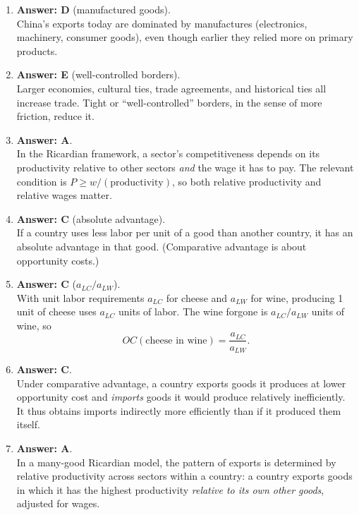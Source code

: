 \documentclass[12pt]{article}
\begin{document}
\begin{enumerate}[label=\textbf{\arabic*.}]
\item \textbf{Answer: D} (manufactured goods).\\
China’s exports today are dominated by manufactures (electronics, machinery, consumer goods), even though earlier they relied more on primary products.

\item \textbf{Answer: E} (well-controlled borders).\\
Larger economies, cultural ties, trade agreements, and historical ties all increase trade. Tight or “well-controlled” borders, in the sense of more friction, reduce it.

\item \textbf{Answer: A}.\\
In the Ricardian framework, a sector’s competitiveness depends on its productivity relative to other sectors \emph{and} the wage it has to pay. The relevant condition is $P \ge w/(\text{productivity})$, so both relative productivity and relative wages matter.

\item \textbf{Answer: C} (absolute advantage).\\
If a country uses less labor per unit of a good than another country, it has an absolute advantage in that good. (Comparative advantage is about opportunity costs.)

\item \textbf{Answer: C} ($a_{LC}/a_{LW}$).\\
With unit labor requirements $a_{LC}$ for cheese and $a_{LW}$ for wine, producing 1 unit of cheese uses $a_{LC}$ units of labor. The wine forgone is $a_{LC}/a_{LW}$ units of wine, so
\[
OC(\text{cheese in wine}) = \frac{a_{LC}}{a_{LW}}.
\]

\item \textbf{Answer: C}.\\
Under comparative advantage, a country exports goods it produces at lower opportunity cost and \emph{imports} goods it would produce relatively inefficiently. It thus obtains imports indirectly more efficiently than if it produced them itself.

\item \textbf{Answer: A}.\\
In a many-good Ricardian model, the pattern of exports is determined by relative productivity across sectors within a country: a country exports goods in which it has the highest productivity \emph{relative to its own other goods}, adjusted for wages.


\end{enumerate}
\end{document}
